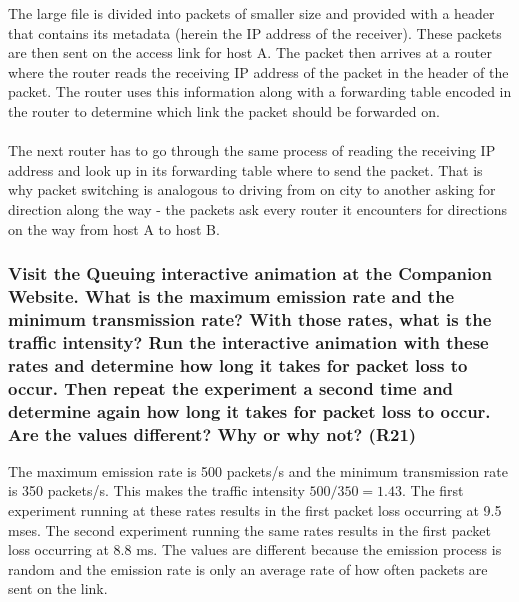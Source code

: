 The large file is divided into packets of smaller size and provided with a header that contains its metadata (herein the IP address of the receiver). These packets are then sent on the access link for host A. The packet then arrives at a router where the router reads the receiving IP address of the packet in the header of the packet. The router uses this information along with a forwarding table encoded in the router to determine which link the packet should be forwarded on. \\
\\
The next router has to go through the same process of reading the receiving IP address and look up in its forwarding table where to send the packet. That is why packet switching is analogous to driving from on city to another asking for direction along the way - the packets ask every router it encounters for directions on the way from host A to host B.



\subsubsection{Visit the Queuing interactive animation at the Companion Website. What is the maximum emission rate and the minimum transmission rate? With those rates, what is the traffic intensity? Run the interactive animation with these rates and determine how long it takes for packet loss to occur. Then repeat the experiment a second time and determine again how long it takes for packet loss to occur. Are the values different? Why or why not? (R21)}

The maximum emission rate is 500 packets/s and the minimum transmission rate is 350 packets/s. This makes the traffic intensity $500/350 = 1.43$. The first experiment running at these rates results in the first packet loss occurring at 9.5 mses. The second experiment running the same rates results in the first packet loss occurring at 8.8 ms. The values are different because the emission process is random and the emission rate is only an average rate of how often packets are sent on the link. 